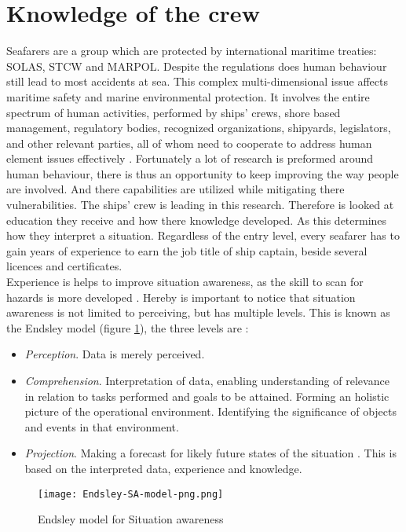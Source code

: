 \section{Knowledge of the crew}
Seafarers are a group which are protected by international maritime treaties: \ac{SOLAS}, \ac{STCW} and \ac{MARPOL}. Despite the regulations does human behaviour still lead to most accidents at sea. This complex multi-dimensional issue affects maritime safety and marine environmental protection. It involves the entire spectrum of human activities, performed by ships' crews, shore based management, regulatory bodies, recognized organizations, shipyards, legislators, and other relevant parties, all of whom need to cooperate to address human element issues effectively \cite{IMO2017}.
Fortunately a lot of research is preformed around human behaviour, there is thus an opportunity to keep improving the way people are involved. And there capabilities are utilized while mitigating there vulnerabilities.
The ships' crew is leading in this research. Therefore is looked at education they receive and how there knowledge developed. As this determines how they interpret a situation.
Regardless of the entry level, every seafarer has to gain years of experience to earn the job title of ship captain, beside several licences and certificates. \\

Experience is helps to improve situation awareness, as the skill to scan for hazards is more developed \cite{Underwood2013}. Hereby is important to notice that situation awareness is not limited to perceiving, but has multiple levels. This is known as the Endsley model (figure \ref{fig:Endsley-SA-model}), the three levels are \cite{Kalloniatis2017}: 
\begin{itemize}
	\item \emph{Perception}. Data is merely perceived.
	\item \emph{Comprehension}. Interpretation of data, enabling understanding of relevance in relation to tasks performed and goals to be attained. Forming an holistic picture of the operational environment. Identifying the significance of objects and events in that environment.
	\item \emph{Projection}. Making a forecast for likely future states of the situation . This is based on the interpreted data, experience and knowledge.
\end{itemize}

\begin{figure}[hb]
	\centering
	\texttt{[image: Endsley-SA-model-png.png]}
	\caption{Endsley model for Situation awareness}
	\label{fig:Endsley-SA-model}
\end{figure}

